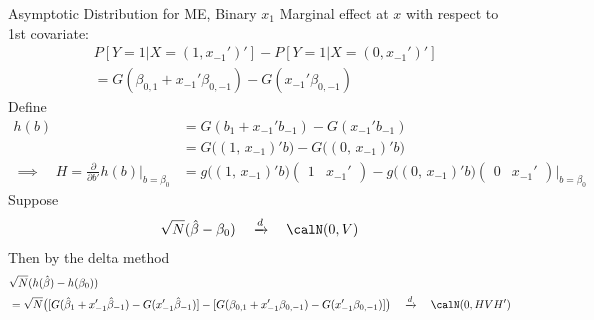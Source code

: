 \documentclass[aspectratio=169, handout]{beamer}
\newcommand{\dto}{\xrightarrow{d}}
\begin{document}
{\footnotesize
\begin{frame}{Asymptotic Distribution for ME, Binary $x_1$}
Marginal effect at $x$ with respect to 1st covariate:
\begin{align*}
  &
  P[Y=1|X=(1,x_{-1}')']
  -
  P[Y=1|X=(0,x_{-1}')']
  \\
  &=
  G(\beta_{0,1} + x_{-1}'\beta_{0,-1})
  -
  G(x_{-1}'\beta_{0,-1})
\end{align*}
Define
\begin{align*}
  h(b)
  &=
  G(b_1 + x_{-1}'b_{-1})
  -
  G(x_{-1}'b_{-1})
  \\
  &=
  G\big(
  (1,\,x_{-1})'b
  \big)
  -
  G\big(
  (0,\,x_{-1})'b
  \big)
  \\
  \implies\quad
  H=
  \frac{\partial}{\partial b'}
  h(b)
  \bigg|_{b=\beta_0}
  &=
  g\big(
  (1,\,x_{-1})'b
  \big)
  \begin{pmatrix}
    1 & x_{-1}'
  \end{pmatrix}
  -
  g\big(
  (0,\,x_{-1})'b
  \big)
  \begin{pmatrix}
    0 & x_{-1}'
  \end{pmatrix}
  \bigg|_{b=\beta_0}
\end{align*}
Suppose
\begin{align*}
  \sqrt{N}(\hat{\beta}-\beta_0)
  \quad\dto\quad
  \calN(0,V)
\end{align*}
Then by the delta method
\begin{align*}
  &\sqrt{N}(h(\hat{\beta})-h(\beta_0))
  \\
  &=
  \sqrt{N}\big(
    [
    G(\hat{\beta}_{1} + x_{-1}'\hat{\beta}_{-1})
    -
    G(x_{-1}'\hat{\beta}_{-1})
    ]
    -
    [
    G(\beta_{0,1} + x_{-1}'\beta_{0,-1})
    -
    G(x_{-1}'\beta_{0,-1})
    ]
  \big)
  \quad\dto\quad
  \calN(0,HVH')
\end{align*}
\end{frame}
}
\end{document}
